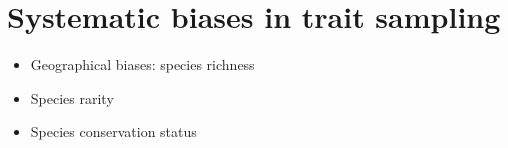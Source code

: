 \section{Systematic biases in trait sampling}

\begin{itemize}
\item Geographical biases: species richness
\item Species rarity
\item Species conservation status
\end{itemize}